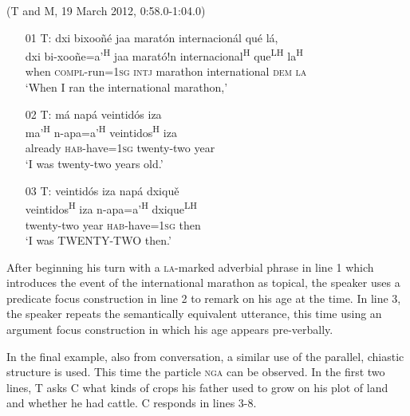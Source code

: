 \ea (T and M, 19 March 2012, 0:58.0-1:04.0)
\begin{itemize}

\item[01 T:] 
\glll dxi bixoo\~{n}\'{e} jaa marat\'{o}n internacion\'{a}l qu\'{e} l\'{a}, \\
dxi bi-xoo\~{n}e=a'\textsuperscript{H} jaa marat\'{o}!n internacional\textsuperscript{H} que\textsuperscript{LH} la\textsuperscript{H} \\
when \textsc{compl}-run=\textsc{1sg} \textsc{intj} marathon international \textsc{dem} \textsc{la} \\
\glt `When I ran the international marathon,'


\item[02 T:] 
\glll m\'{a} nap\'{a} veintid\'{o}s iza \\
 ma'\textsuperscript{H} n-apa=a'\textsuperscript{H} veintidos\textsuperscript{H} iza \\
already \textsc{hab}-have=\textsc{1sg} twenty-two year \\
\glt `I was twenty-two years old.' 


\item[03 T:] 
\glll veintid\'{o}s iza nap\'{a} dxiqu\v{e} \\
veintidos\textsuperscript{H} iza n-apa=a'\textsuperscript{H} dxique\textsuperscript{LH} \\
twenty-two year \textsc{hab}-have=\textsc{1sg} then \\
\glt `I was TWENTY-TWO then.' 


\end{itemize}
\z

After beginning his turn with a \textsc{la}-marked adverbial phrase in line 1 which introduces the event of the international marathon as topical, the speaker uses a predicate focus construction in line 2 to remark on his age at the time. In line 3, the speaker repeats the semantically equivalent utterance, this time using an argument focus construction in which his age appears pre-verbally. 


In the final example, also from conversation, a similar use of the parallel, chiastic structure is used. This time the particle \textsc{nga} can be observed. In the first two lines, T asks C what kinds of crops his father used to grow on his plot of land and whether he had cattle. C responds in lines 3-8.

